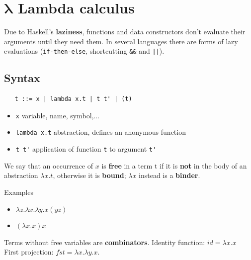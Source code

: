 \chapter{\texorpdfstring{$\bm{\lambda}$}{} Lambda calculus}

Due to Haskell's \textbf{laziness}, functions and data constructors don’t evaluate their
arguments until they need them.
In several languages there are forms of lazy evaluations (\texttt{if-then-else}, shortcutting \texttt{\&\&} and \texttt{||}).

\section{Syntax}


\begin{lstlisting}
   t ::= x | lambda x.t | t t' | (t)
\end{lstlisting}
\begin{itemize}
   \item \lstinline|x| variable, name, symbol,...
   \item \lstinline|lambda x.t| abstraction, defines an anonymous function
   \item \lstinline|t t'| application of function \lstinline|t| to argument \lstinline|t'|
\end{itemize}

We say that an occurrence of $x$ is \textbf{free} in a term t if it is \textbf{not} in the body of an abstraction $\lambda x. t$, otherwise it is \textbf{bound};
$\lambda x$ instead is a \textbf{binder}.\\
{Examples\ns
\begin{itemize}
   \item 
   $\lambda z. \lambda x. \lambda y. x (y z)$\\
   \item $(\lambda x. x) x$
\end{itemize}}

Terms without free variables are \textbf{combinators}.
Identity function: $id = \lambda x. x$\\
First projection: $fst = \lambda x. \lambda y. x$.

